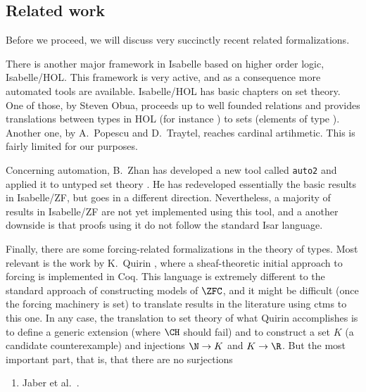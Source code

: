 \subsection{Related work}\label{sec:related-work}
Before we proceed, we will discuss very succinctly recent related
formalizations.

There is another major framework in Isabelle based on higher order
logic, Isabelle/HOL. This framework is very active, and as a 
consequence more automated tools are available. Isabelle/HOL has 
basic chapters on set theory. One of those, by Steven Obua, proceeds up to
well founded relations and provides translations between types in HOL
(for instance ) to  sets  (elements of type
). Another one, by A.~Popescu and D.~Traytel, reaches
cardinal artihmetic. This is fairly limited for our purposes.

Concerning automation, B.~Zhan has developed a new tool called
\texttt{auto2} and applied it to untyped set theory
\cite{10.1007/978-3-319-66107-0_32}. He has redeveloped essentially
the basic results in Isabelle/ZF, but goes in a different
direction. Nevertheless, a majority of results in
Isabelle/ZF are not yet implemented using this tool, and a another
downside is that proofs using it do not follow the standard Isar
language.

Finally, there are some forcing-related formalizations in the theory
of types. Most relevant is the work by K.~Quirin \cite{Quirin}, where
a sheaf-theoretic initial approach to forcing is implemented in
Coq. This language is extremely different to the standard approach of
constructing models of $\ZFC$, and it might be difficult (once the
forcing machinery is set) to translate results in the literature using
ctms to this one. In any case, the translation to set theory of what
Quirin accomplishes is to define a generic extension (where $\CH$
should fail) and to construct a set $K$ (a candidate counterexample)
and injections $\N\to K$ and $K\to\R$. But the most important part,
that is, that there are no surjections

\begin{enumerate}
\item Jaber et al.\ \cite{jaber:hal-01319066}.
\end{enumerate}

